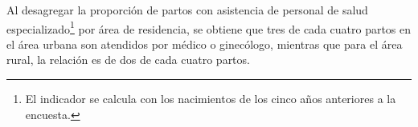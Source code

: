  Al desagregar la proporción de partos con asistencia de personal de salud especializado\footnote{El indicador se calcula con los nacimientos de los cinco años anteriores a la encuesta.} por área de residencia, se obtiene que tres de cada cuatro partos en el área urbana son atendidos por médico o ginecólogo, mientras que para el área rural, la relación es de  dos de cada cuatro partos.